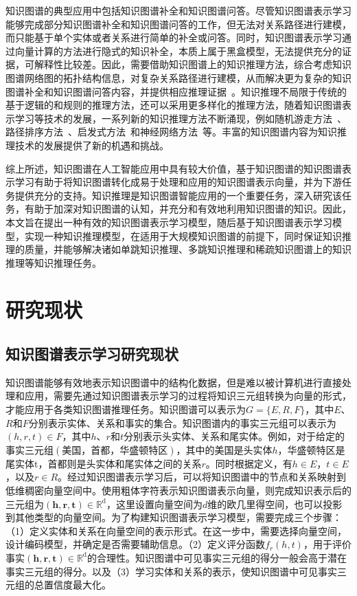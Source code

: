 \documentclass[algorithmlist, AutoFakeBold, AutoFakeSlant, figurelist, tablelist, nomlist, masters]{seuthesix}
\begin{document}
知识图谱的典型应用中包括知识图谱补全和知识图谱问答。尽管知识图谱表示学习能够完成部分知识图谱补全和知识图谱问答的工作，但无法对关系路径进行建模，而只能基于单个实体或者关系进行简单的补全或问答。同时，知识图谱表示学习通过向量计算的方法进行隐式的知识补全，本质上属于黑盒模型，无法提供充分的证据，可解释性比较差。因此，需要借助知识图谱上的知识推理方法，综合考虑知识图谱网络图的拓扑结构信息，对复杂关系路径进行建模，从而解决更为复杂的知识图谱补全和知识图谱问答内容，并提供相应推理证据~\cite{chen2020review}。知识推理不局限于传统的基于逻辑的和规则的推理方法，还可以采用更多样化的推理方法，随着知识图谱表示学习等技术的发展，一系列新的知识推理方法不断涌现，例如随机游走方法~\cite{jagvaral2020path}、路径排序方法~\cite{zhao2021target}、启发式方法~\cite{he2021heuristic}和神经网络方法~\cite{wang2018deep}等。丰富的知识图谱内容为知识推理技术的发展提供了新的机遇和挑战。

综上所述，知识图谱在人工智能应用中具有较大价值，基于知识图谱的知识图谱表示学习有助于将知识图谱转化成易于处理和应用的知识图谱表示向量，并为下游任务提供充分的支持。知识推理是知识图谱智能应用的一个重要任务，深入研究该任务，有助于加深对知识图谱的认知，并充分和有效地利用知识图谱的知识。因此，本文旨在提出一种有效的知识图谱表示学习模型，随后基于知识图谱表示学习模型，实现一种知识推理模型，在适用于大规模知识图谱的前提下，同时保证知识推理的质量，并能够解决诸如单跳知识推理、多跳知识推理和稀疏知识图谱上的知识推理等知识推理任务。

\section{研究现状}
\subsection{知识图谱表示学习研究现状}
知识图谱能够有效地表示知识图谱中的结构化数据，但是难以被计算机进行直接处理和应用，需要先通过知识图谱表示学习的过程将知识三元组转换为向量的形式，才能应用于各类知识图谱推理任务。知识图谱可以表示为$G=\{E, R, F\}$，其中$E$、$R$和$F$分别表示实体、关系和事实的集合。知识图谱内的事实三元组可以表示为$(h, r, t) \in F$，其中$h$、$r$和$t$分别表示头实体、关系和尾实体。例如，对于给定的事实三元组$\left(\mbox{美国，首都，华盛顿特区}\right)$，其中的$\mbox{美国}$是头实体$h$，$\mbox{华盛顿特区}$是尾实体t，$\mbox{首都}$则是头实体和尾实体之间的关系$r$。同时根据定义，有$h \in E$，$t \in E$，以及$r \in R$。经过知识图谱表示学习后，可以将知识图谱中的节点和关系映射到低维稠密向量空间中。使用粗体字符表示知识图谱表示向量，则完成知识表示后的三元组为$\left(\bm{h}, \bm{r}, \bm{t}\right) \in \mathbb{R}^{\mathrm{d}}$，这里设置向量空间为$d$维的欧几里得空间，也可以投影到其他类型的向量空间。为了构建知识图谱表示学习模型，需要完成三个步骤：（1）定义实体和关系在向量空间的表示形式。在这一步中，需要选择向量空间，设计编码模型，并确定是否需要辅助信息。（2）定义评分函数$f_r(h, t)$，用于评价事实$\left(\bm{h}, \bm{r}, \bm{t}\right) \in \mathbb{R}^{\mathrm{d}}$的合理性。知识图谱中可见事实三元组的得分一般会高于潜在事实三元组的得分。以及（3）学习实体和关系的表示，使知识图谱中可见事实三元组的总置信度最大化。
\end{document}
